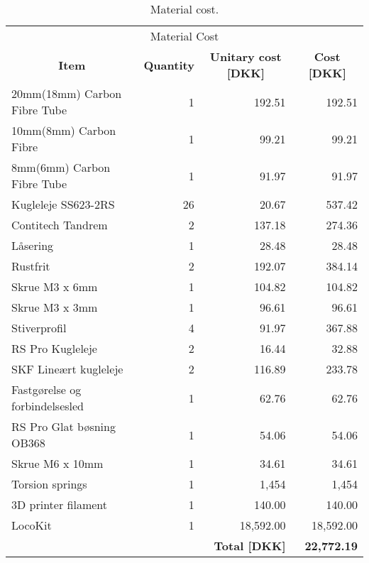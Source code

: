 \begin{table}[thb]
\caption{Material cost.}
\centering
\begin{tabular}{l|r|r|r}
\multicolumn{4}{c}{\Large Material Cost} \\
\multicolumn{1}{c|}{\textbf{Item}} & \multicolumn{1}{c|}{\textbf{Quantity}} & \multicolumn{1}{c|}{\textbf{Unitary cost [DKK]}} & \multicolumn{1}{c}{\textbf{Cost [DKK]}} \\ \hline
20mm(18mm) Carbon Fibre Tube & 1 & 192.51 & 192.51 \\ \hline
10mm(8mm) Carbon Fibre & 1 & 99.21 & 99.21 \\ \hline
8mm(6mm) Carbon Fibre Tube & 1 & 91.97 & 91.97 \\ \hline
Kugleleje SS623-2RS & 26 & 20.67 & 537.42 \\ \hline
Contitech Tandrem & 2 & 137.18 & 274.36 \\ \hline
Låsering & 1 & 28.48 & 28.48 \\ \hline
Rustfrit & 2 & 192.07 & 384.14 \\ \hline
Skrue M3 x 6mm & 1 & 104.82 & 104.82 \\ \hline
Skrue M3 x 3mm & 1 & 96.61 & 96.61 \\ \hline
Stiverprofil & 4 & 91.97 & 367.88 \\ \hline
RS Pro Kugleleje & 2 & 16.44 & 32.88 \\ \hline
SKF Lineært kugleleje & 2 & 116.89 & 233.78 \\ \hline
Fastgørelse og forbindelsesled & 1 & 62.76 & 62.76 \\ \hline
RS Pro Glat bøsning OB368 & 1 & 54.06 & 54.06 \\ \hline
Skrue M6 x 10mm & 1 & 34.61 & 34.61 \\ \hline
Torsion springs & 1 & 1,454 & 1,454 \\ \hline
3D printer filament & 1 & 140.00 & 140.00 \\ \hline
LocoKit  & 1 & 18,592.00 & 18,592.00 \\ \hline
\multicolumn{2}{l}{} & \textbf{Total [DKK]} & \textbf{22,772.19} \\
\end{tabular}
\label{tab:material_cost}
\end{table}

\null
\vfill
